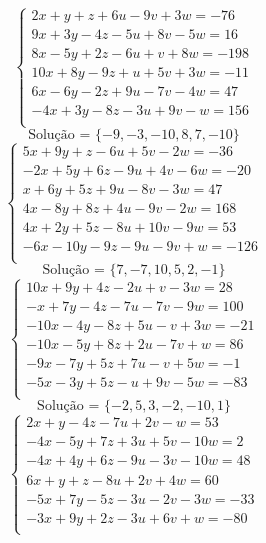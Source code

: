 \documentclass[12pt,oneside,a4paper]{article}
\begin{document}
\vspace{\baselineskip}
\begin{equation*}
\begin{cases}
2x+y+z+6u-9v+3w=-76 \\
9x+3y-4z-5u+8v-5w=16 \\
8x-5y+2z-6u+v+8w=-198 \\
10x+8y-9z+u+5v+3w=-11 \\
6x-6y-2z+9u-7v-4w=47 \\
-4x+3y-8z-3u+9v-w=156 \\
\end{cases}
\end{equation*}
\begin{equation*}
\text{Solução = }\{-9,-3,-10,8,7,-10\}
\end{equation*}
\vspace{\baselineskip}
\begin{equation*}
\begin{cases}
5x+9y+z-6u+5v-2w=-36 \\
-2x+5y+6z-9u+4v-6w=-20 \\
x+6y+5z+9u-8v-3w=47 \\
4x-8y+8z+4u-9v-2w=168 \\
4x+2y+5z-8u+10v-9w=53 \\
-6x-10y-9z-9u-9v+w=-126 \\
\end{cases}
\end{equation*}
\begin{equation*}
\text{Solução = }\{7,-7,10,5,2,-1\}
\end{equation*}
\vspace{\baselineskip}
\begin{equation*}
\begin{cases}
10x+9y+4z-2u+v-3w=28 \\
-x+7y-4z-7u-7v-9w=100 \\
-10x-4y-8z+5u-v+3w=-21 \\
-10x-5y+8z+2u-7v+w=86 \\
-9x-7y+5z+7u-v+5w=-1 \\
-5x-3y+5z-u+9v-5w=-83 \\
\end{cases}
\end{equation*}
\begin{equation*}
\text{Solução = }\{-2,5,3,-2,-10,1\}
\end{equation*}
\vspace{\baselineskip}
\begin{equation*}
\begin{cases}
2x+y-4z-7u+2v-w=53 \\
-4x-5y+7z+3u+5v-10w=2 \\
-4x+4y+6z-9u-3v-10w=48 \\
6x+y+z-8u+2v+4w=60 \\
-5x+7y-5z-3u-2v-3w=-33 \\
-3x+9y+2z-3u+6v+w=-80 \\
\end{cases}
\end{equation*}
\end{document}
